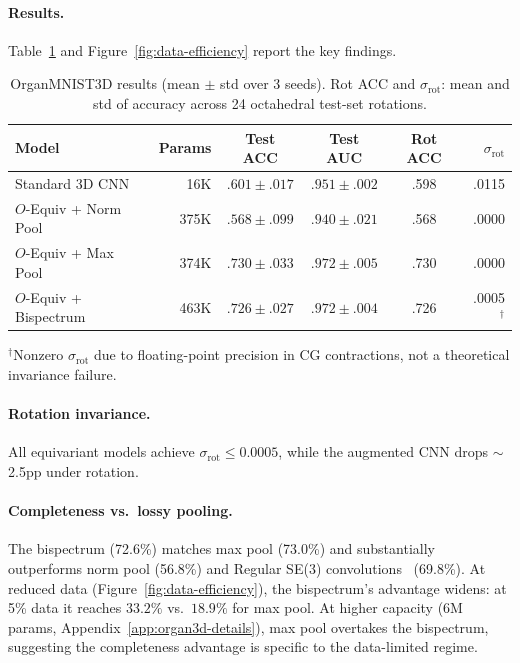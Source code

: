 \documentclass{article}
\theoremstyle{definition}
\theoremstyle{remark}
\theoremstyle{definition}
\begin{document}
\paragraph{Results.}
Table~\ref{tab:organ3d-results} and Figure~\ref{fig:data-efficiency} report
the key findings.

\begin{table}[t]
  \caption{OrganMNIST3D results (mean $\pm$ std over 3 seeds). Rot ACC and
    $\sigma_{\mathrm{rot}}$: mean and std of accuracy across 24 octahedral
    test-set rotations.}
  \label{tab:organ3d-results}
  \centering
  \small
  \begin{tabular}{lrcccr}
    \toprule
    Model & Params & Test ACC & Test AUC & Rot ACC & $\sigma_{\mathrm{rot}}$ \\
    \midrule
    Standard 3D CNN          & 16K  & $.601 \pm .017$ & $.951 \pm .002$ & .598 & .0115 \\
    $O$-Equiv + Norm Pool    & 375K & $.568 \pm .099$ & $.940 \pm .021$ & .568 & .0000 \\
    $O$-Equiv + Max Pool     & 374K & $.730 \pm .033$ & $.972 \pm .005$ & .730 & .0000 \\
    $O$-Equiv + Bispectrum   & 463K & $.726 \pm .027$ & $.972 \pm .004$ & .726 & .0005$^\dagger$ \\
    \bottomrule
  \end{tabular}

  \vspace{0.3em}
  {\small $^\dagger$Nonzero $\sigma_{\mathrm{rot}}$ due to floating-point precision in CG contractions, not a theoretical invariance failure.}
\end{table}

\paragraph{Rotation invariance.}
All equivariant models achieve $\sigma_{\mathrm{rot}} \leq 0.0005$,
while the augmented CNN drops ${\sim}$2.5pp under rotation.

\paragraph{Completeness vs.\ lossy pooling.}
The bispectrum (72.6\%) matches max pool (73.0\%) and substantially
outperforms norm pool (56.8\%) and Regular SE(3)
convolutions~\citep{kuipers2023regular} (69.8\%).
At reduced data (Figure~\ref{fig:data-efficiency}), the bispectrum's
advantage widens: at 5\% data it reaches $33.2\%$ vs.\ $18.9\%$ for max
pool. At higher capacity (6M params,
Appendix~\ref{app:organ3d-details}), max pool overtakes the bispectrum,
suggesting the completeness advantage is specific to the data-limited
regime.
\end{document}
